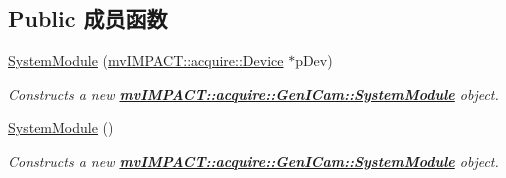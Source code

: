 \subsection*{Public 成员函数}
\begin{DoxyCompactItemize}
\item 
\hyperlink{classmv_i_m_p_a_c_t_1_1acquire_1_1_gen_i_cam_1_1_system_module_afa84665420b30c9d83ed1aada601a583}{System\+Module} (\hyperlink{classmv_i_m_p_a_c_t_1_1acquire_1_1_device}{mv\+I\+M\+P\+A\+C\+T\+::acquire\+::\+Device} $\ast$p\+Dev)
\begin{DoxyCompactList}\small\item\em Constructs a new {\bfseries \hyperlink{classmv_i_m_p_a_c_t_1_1acquire_1_1_gen_i_cam_1_1_system_module}{mv\+I\+M\+P\+A\+C\+T\+::acquire\+::\+Gen\+I\+Cam\+::\+System\+Module}} object. \end{DoxyCompactList}\item 
\hypertarget{classmv_i_m_p_a_c_t_1_1acquire_1_1_gen_i_cam_1_1_system_module_aa1d7dc89a345ea7f459e47949480b646}{\hyperlink{classmv_i_m_p_a_c_t_1_1acquire_1_1_gen_i_cam_1_1_system_module_aa1d7dc89a345ea7f459e47949480b646}{System\+Module} ()}\label{classmv_i_m_p_a_c_t_1_1acquire_1_1_gen_i_cam_1_1_system_module_aa1d7dc89a345ea7f459e47949480b646}

\begin{DoxyCompactList}\small\item\em Constructs a new {\bfseries \hyperlink{classmv_i_m_p_a_c_t_1_1acquire_1_1_gen_i_cam_1_1_system_module}{mv\+I\+M\+P\+A\+C\+T\+::acquire\+::\+Gen\+I\+Cam\+::\+System\+Module}} object. \end{DoxyCompactList}\end{DoxyCompactItemize}
